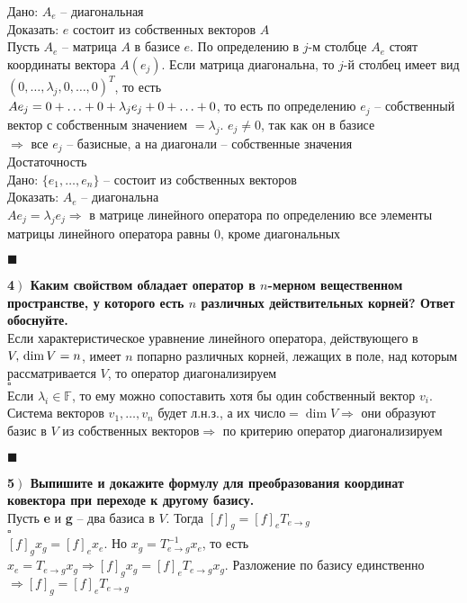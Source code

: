 \documentclass[a4paper,12pt]{article}
\newcommand*{\hm}[1]{#1\nobreak\discretionary{}
	{\hbox{$\mathsurround=0pt #1$}}{}}
\begin{document}
Дано: $A_e$ -- диагональная\\
Доказать: $e$ состоит из собственных векторов $A$\\
Пусть $A_e$ -- матрица $A$ в базисе $e$. По определению в $j$-м столбце $A_e$ стоят координаты вектора $A(e_j)$. Если матрица диагональна, то $j$-й столбец имеет вид $(0, \ldots, \lambda_j, 0, \ldots, 0)^T$, то есть \\$Ae_j=0+\ldots+0\hm{+}\lambda_je_j+0+\ldots+0$, то есть по определению $e_j$ -- собственный вектор с собственным значением $=\lambda_j$. $e_j\ne 0$, так как он в базисе\\
$\Rightarrow$ все $e_j$ -- базисные, а на диагонали -- собственные значения\\
Достаточность\\
Дано: $\{e_1, \ldots, e_n \}$ -- состоит из собственных векторов\\
Доказать: $A_e$ -- диагональна\\
$Ae_j=\lambda_je_j\Rightarrow$ в матрице линейного оператора по определению все элементы матрицы линейного оператора равны 0, кроме диагональных
\begin{flushright}
	$\blacksquare$
\end{flushright}
\textbf{4$\left.\right)$ Каким свойством обладает оператор в $n$-мерном вещественном пространстве, у которого есть $n$ различных действительных корней? Ответ обоснуйте.}\\
Если характеристическое уравнение линейного оператора, действующего в $V,\\ \dim V=n$, имеет $n$ попарно различных корней, лежащих в поле, над которым рассматривается $V$, то оператор диагонализируем\\
$\square$\\
Если $\lambda_i\in\mathbb{F}$, то ему можно сопоставить хотя бы один собственный вектор $v_i$. Система векторов $v_1, \ldots, v_n$ будет л.н.з., а их число$=\dim V\Rightarrow$ они образуют базис в $V$ из собственных векторов$\Rightarrow$ по критерию оператор диагонализируем
\begin{flushright}
	$\blacksquare$
\end{flushright}
\textbf{5$\left.\right)$ Выпишите и докажите формулу для преобразования координат ковектора при переходе к другому базису.}\\
Пусть \textbf{e} и \textbf{g} -- два базиса в $V$. Тогда $[f]_g=[f]_eT_{e\rightarrow g}$\\
$\square$\\
$[f]_gx_g=[f]_ex_e$. Но $x_g=T_{e\rightarrow g}^{-1}x_e$, то есть $x_e=T_{e\rightarrow g}x_g\Rightarrow[f]_gx_g=[f]_eT_{e\rightarrow g}x_g$. Разложение по базису единственно$\Rightarrow[f]_g=[f]_eT_{e\rightarrow g}$
\end{document}
